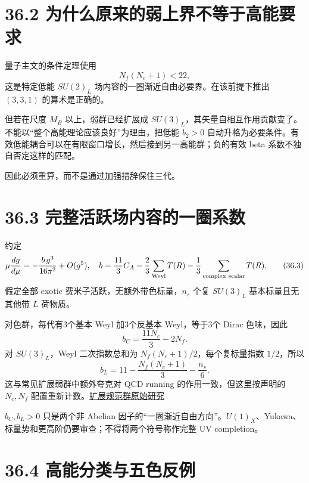 \documentclass[
  11pt,
  oneside]{book}
\begin{document}
\hypertarget{ux4e3aux4ec0ux4e48ux539fux6765ux7684ux5f31ux4e0aux754cux4e0dux7b49ux4e8eux9ad8ux80fdux8981ux6c42}{%
\section{36.2
为什么原来的弱上界不等于高能要求}\label{ux4e3aux4ec0ux4e48ux539fux6765ux7684ux5f31ux4e0aux754cux4e0dux7b49ux4e8eux9ad8ux80fdux8981ux6c42}}

量子主文的条件定理使用 \[
N_f(N_c+1)<22,
\tag{36.2}
\] 这是特定低能 \(SU(2)_L\) 场内容的一圈渐近自由必要界。在该前提下推出
\((3,3,1)\) 的算术是正确的。

但若在尺度 \(M_B\) 以上，弱群已经扩展成
\(SU(3)_L\)，其矢量自相互作用贡献变了。不能以``整个高能理论应该良好''为理由，把低能
\(b_2>0\)
自动升格为必要条件。有效低能耦合可以在有限窗口增长，然后接到另一高能群；负的有效
beta 系数不独自否定这样的匹配。

因此必须重算，而不是通过加强措辞保住三代。

\hypertarget{ux5b8cux6574ux6d3bux8dc3ux573aux5185ux5bb9ux7684ux4e00ux5708ux7cfbux6570}{%
\section{36.3
完整活跃场内容的一圈系数}\label{ux5b8cux6574ux6d3bux8dc3ux573aux5185ux5bb9ux7684ux4e00ux5708ux7cfbux6570}}

约定 \[
\mu\frac{dg}{d\mu}=-\frac{b\,g^3}{16\pi^2}+O(g^5),\quad
b=\frac{11}{3}C_A-\frac23\sum_{\rm Weyl}T(R)
-\frac13\sum_{\rm complex\ scalar}T(R).
\tag{36.3}
\] 假定全部 exotic 费米子活跃，无额外带色标量，\(n_s\) 个复 \(SU(3)_L\)
基本标量且无其他带 \(L\) 荷物质。

对色群，每代有3个基本 Weyl 加3个反基本 Weyl，等于3个 Dirac 色味，因此 \[
b_C=\frac{11N_c}{3}-2N_f.
\tag{36.4}
\] 对 \(SU(3)_L\)，Weyl 二次指数总和为 \(N_f(N_c+1)/2\)，每个复标量指数
\(1/2\)，所以 \[
b_L=11-\frac{N_f(N_c+1)}3-\frac{n_s}{6}.
\tag{36.5}
\] 这与常见扩展弱群中额外夸克对 QCD running 的作用一致，但这里按声明的
\(N_c,N_f\)
配置重新计数。\href{https://arxiv.org/abs/1205.4483}{扩展规范群原始研究}

\(b_C,b_L>0\) 只是两个非 Abelian
因子的``一圈渐近自由方向''。\(U(1)_X\)、Yukawa、标量势和更高阶仍要审查；不得将两个符号称作完整
UV completion。

\hypertarget{ux9ad8ux80fdux5206ux7c7bux4e0eux4e94ux8272ux53cdux4f8b}{%
\section{36.4
高能分类与五色反例}\label{ux9ad8ux80fdux5206ux7c7bux4e0eux4e94ux8272ux53cdux4f8b}}
\end{document}
